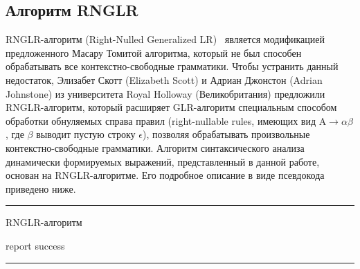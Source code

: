 \subsection{Алгоритм RNGLR}

RNGLR-алгоритм (Right-Nulled Generalized LR)~\cite{RNGLR} является модификацией предложенного Масару Томитой алгоритма, который не был способен обрабатывать все контекстно-свободные грамматики. Чтобы устранить данный недостаток, Элизабет Скотт (Elizabeth Scott) и Адриан Джонстон (Adrian Johnstone) из университета Royal Holloway (Великобритания) предложили RNGLR-алгоритм, который расширяет GLR-алгоритм специальным способом обработки обнуляемых справа правил (right-nullable rules, имеющих вид $\mathrm{A} \rightarrow \alpha \beta$, где $\beta$ выводит пустую строку $\epsilon$), позволяя обрабатывать произвольные контекстно-свободные грамматики. Алгоритм синтаксического анализа динамически формируемых выражений, представленный в данной работе, основан на RNGLR-алгоритме. Его подробное описание в виде псевдокода приведено ниже.

\begin{listing}[!ht]
\hrule
\begin{algorithmic}[1]
\caption{RNGLR-алгоритм}
\label{rnglr1}
   
   
     {report success}
    \EndIf
  \Else
    \EndFor
    \EndIf
  \EndIf
\EndFunction
{}
    \EndFor
  \EndWhile
\EndFunction
{}
  \EndWhile
\EndFunction
\end{algorithmic}
\hrule
\end{listing}

